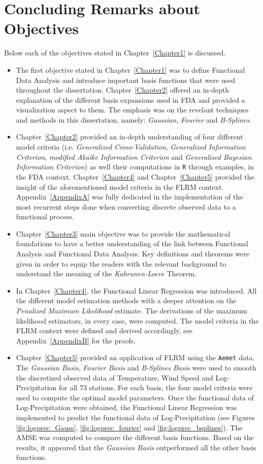 \section{Concluding Remarks about Objectives}
Below each of the objectives stated in Chapter~\ref{Chapter1} is discussed.
\begin{itemize}
\item The first objective stated in Chapter~\ref{Chapter1} was to define Functional Data Analysis and introduce important basis functions that were used throughout the dissertation. Chapter~\ref{Chapter2} offered an in-depth explanation of the different basis expansions used in FDA and provided a visualization aspect to them. The emphasis was on the revelant techniques and methods in this dissertation, namely: \textit{Gaussian}, \textit{Fourier} and \textit{B-Splines}.
\item Chapter~\ref{Chapter2} provided an in-depth understanding of four different model criteria (i.e. \textit{Generalized Cross-Validation}, \textit{Generalized Information Criterion}, \textit{modified Akaike Information Criterion} and \textit{Generalized Bayesian Information Criterion}) as well their computations in \texttt{R} through examples, in the FDA context. Chapter~\ref{Chapter4} and Chapter~\ref{Chapter5} provided the insight of the aforementioned model criteria in the FLRM context. Appendix~\ref{AppendixA} was fully dedicated in the implementation of the most recurrent steps done when converting discrete observed data to a functional process. 
\item Chapter~\ref{Chapter3} main objective was to provide the mathematical foundations to have a better understanding of the link between Functional Analysis and Functional Data Analysis. Key definitions and theorems were given in order to equip the readers with the relevant background to understand the meaning of the \textit{Kahrunen-Loeve} Theorem.
\item In Chapter~\ref{Chapter4}, the Functional Linear Regression was introduced. All the different model estimation methods with a deeper attention on the \textit{Penalized Maximum Likelihood} estimate. The derivations of the maximum likelihood estimators, in every case, were computed. The model criteria in the FLRM context were defined and derived accordingly, see Appendix~\ref{AppendixB} for the proofs.
\item Chapter~\ref{Chapter5} provided an application of FLRM using the \texttt{Aemet} data. The \textit{Gaussian Basis}, \textit{Fourier Basis} and \textit{B-Splines Basis} were used to smooth the discretized observed data of Temperature, Wind Speed and Log-Precipitation for all 73 stations. For each basis, the four model criteria were used to compute the optimal model parameters. Once the functional data of Log-Precipitation were obtained, the Functional Linear Regression was implemented to predict the functional data of Log-Precipitation (see Figures \ref{fig:logprec_Gauss}, \ref{fig:logprec_fourier} and \ref{fig:logprec_bsplines}). The AMSE was computed to compare the different basis functions. Based on the results, it appeared that the \textit{Gaussian Basis} outperformed all the other basis functions.
\end{itemize}

